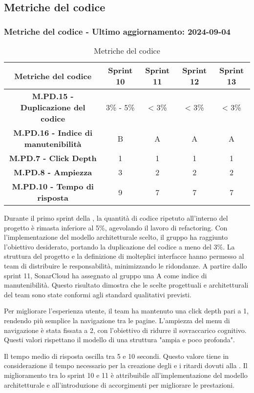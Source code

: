 \subsection{Metriche del codice}

\subsubsection*{Metriche del codice - Ultimo aggiornamento: 2024-09-04}

\begin{table}[H]
  \centering
  \begin{tabular}{|c|c|c|c|c|}
      \hline
      Metriche del codice & \textbf{Sprint 10} & \textbf{Sprint 11} & \textbf{Sprint 12}  & \textbf{Sprint 13} \\
      \hline
      \textbf{M.PD.15 - Duplicazione del codice} & 3\% - 5\% & < 3\% & < 3\% & < 3\% \\
      \hline
      \textbf{M.PD.16 - Indice di manutenibilità} & B & A & A & A \\
      \hline
      \textbf{M.PD.7 - Click Depth} & 1 & 1 & 1 & 1 \\
      \hline
      \textbf{M.PD.8 - Ampiezza} & 3 & 2 & 2 & 2 \\
      \hline
      \textbf{M.PD.10 - Tempo di risposta } & 9 & 7 & 7 & 7 \\
      \hline
  \end{tabular}
  \caption{Metriche del codice}
\end{table}

\par Durante il primo sprint della , la quantità di codice ripetuto all'interno del progetto è rimasta inferiore al 5\%, agevolando il lavoro di refactoring. Con l'implementazione del modello architetturale scelto, il gruppo ha raggiunto l'obiettivo desiderato, portando la duplicazione del codice a meno del 3\%. La struttura del progetto e la definizione di molteplici interfacce hanno permesso al team di distribuire le responsabilità, minimizzando le ridondanze. A partire dallo sprint 11, SonarCloud ha assegnato al gruppo una A come indice di manutenibilità. Questo risultato dimostra che le scelte progettuali e architetturali del team sono state conformi agli standard qualitativi previsti.

\par Per migliorare l'esperienza utente, il team ha mantenuto una click depth pari a 1, rendendo più semplice la navigazione tra le pagine. L'ampiezza del menu di navigazione è stata fissata a 2, con l'obiettivo di ridurre il sovraccarico cognitivo. Questi valori rispettano il modello di una struttura "ampia e poco profonda".

\par Il tempo medio di risposta oscilla tra 5 e 10 secondi. Questo valore tiene in considerazione il tempo necessario per la creazione degli  e i ritardi dovuti alla . Il miglioramento tra lo sprint 10 e 11 è attribuibile all'implementazione del modello architetturale e all'introduzione di accorgimenti per migliorare le prestazioni.